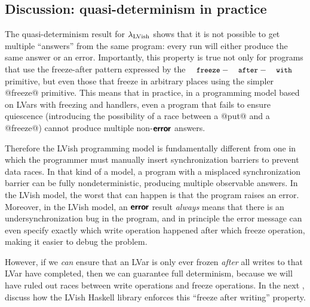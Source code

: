 \subsection{Discussion: quasi-determinism in practice}


The quasi-determinism result for $\lambda_{\textrm{LVish}}$ shows that it is not
possible to get multiple ``answers'' from the same program: every run
will either produce the same answer or an error.  Importantly, this
property is true not only for programs that use the freeze-after
pattern expressed by the $\FAW$ primitive, but even those that freeze
in arbitrary places using the simpler @freeze@ primitive.  This means
that in practice, in a programming model based on LVars with freezing
and handlers, even a program that fails to ensure quiescence
(introducing the possibility of a race between a @put@ and a
@freeze@) cannot produce multiple non-$\textbf{\textsf{error}}$ answers.

Therefore the LVish programming model is fundamentally different from
one in which the programmer must manually insert synchronization
barriers to prevent data races.  In that kind of a model, a program
with a misplaced synchronization barrier can be fully
nondeterministic, producing multiple observable answers.  In the LVish
model, the worst that can happen is that the program raises an error.
Moreover, in the LVish model, an $\textbf{\textsf{error}}$ result \emph{always} means
that there is an undersynchronization bug in the program, and in
principle the error message can even specify exactly which write
operation happened after which freeze operation, making it easier to
debug the problem.

However, if we \emph{can} ensure that an LVar is only ever frozen
\emph{after} all writes to that LVar have completed, then we can
guarantee full determinism, because we will have ruled out races
between write operations and freeze operations.  In the next ,
 discuss how the LVish Haskell library enforces this ``freeze after
writing'' property.
